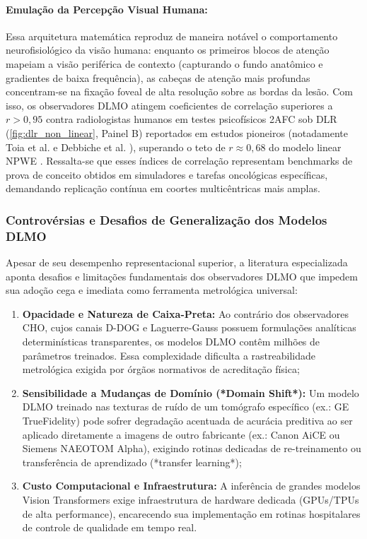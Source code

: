 \documentclass[
  12pt,
  a4paper,
  oneside
]{report}
\begin{document}
\paragraph{Emulação da Percepção Visual Humana:} Essa arquitetura matemática reproduz de maneira notável o comportamento neurofisiológico da visão humana: enquanto os primeiros blocos de atenção mapeiam a visão periférica de contexto (capturando o fundo anatômico e gradientes de baixa frequência), as cabeças de atenção mais profundas concentram-se na fixação foveal de alta resolução sobre as bordas da lesão. Com isso, os observadores DLMO atingem coeficientes de correlação superiores a $r > 0{,}95$ contra radiologistas humanos em testes psicofísicos 2AFC sob DLR (\cref{fig:dlr_non_linear}, Painel B) reportados em estudos pioneiros (notadamente Toia et al. \cite{toia2023} e Debbiche et al. \cite{debbiche2024}), superando o teto de $r \approx 0{,}68$ do modelo linear NPWE \cite{racine2021}. Ressalta-se que esses índices de correlação representam benchmarks de prova de conceito obtidos em simuladores e tarefas oncológicas específicas, demandando replicação contínua em coortes multicêntricas mais amplas.

\subsubsection{Controvérsias e Desafios de Generalização dos Modelos DLMO}
\label{subsubsec:controversias_dlmo}
Apesar de seu desempenho representacional superior, a literatura especializada aponta desafios e limitações fundamentais dos observadores DLMO que impedem sua adoção cega e imediata como ferramenta metrológica universal:
\begin{enumerate}
  \item \textbf{Opacidade e Natureza de Caixa-Preta:} Ao contrário dos observadores CHO, cujos canais D-DOG e Laguerre-Gauss possuem formulações analíticas determinísticas transparentes, os modelos DLMO contêm milhões de parâmetros treinados. Essa complexidade dificulta a rastreabilidade metrológica exigida por órgãos normativos de acreditação física;
  \item \textbf{Sensibilidade a Mudanças de Domínio (*Domain Shift*):} Um modelo DLMO treinado nas texturas de ruído de um tomógrafo específico (ex.: GE TrueFidelity) pode sofrer degradação acentuada de acurácia preditiva ao ser aplicado diretamente a imagens de outro fabricante (ex.: Canon AiCE ou Siemens NAEOTOM Alpha), exigindo rotinas dedicadas de re-treinamento ou transferência de aprendizado (*transfer learning*);
  \item \textbf{Custo Computacional e Infraestrutura:} A inferência de grandes modelos Vision Transformers exige infraestrutura de hardware dedicada (GPUs/TPUs de alta performance), encarecendo sua implementação em rotinas hospitalares de controle de qualidade em tempo real.
\end{enumerate}
\end{document}
